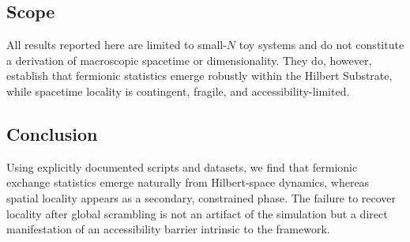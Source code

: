 \subsection*{Scope}

All results reported here are limited to small-$N$ toy systems and do not
constitute a derivation of macroscopic spacetime or dimensionality. They do,
however, establish that fermionic statistics emerge robustly within the
Hilbert Substrate, while spacetime locality is contingent, fragile, and
accessibility-limited.

\subsection*{Conclusion}

Using explicitly documented scripts and datasets, we find that fermionic
exchange statistics emerge naturally from Hilbert-space dynamics, whereas
spatial locality appears as a secondary, constrained phase. The failure to
recover locality after global scrambling is not an artifact of the simulation
but a direct manifestation of an accessibility barrier intrinsic to the
framework.
